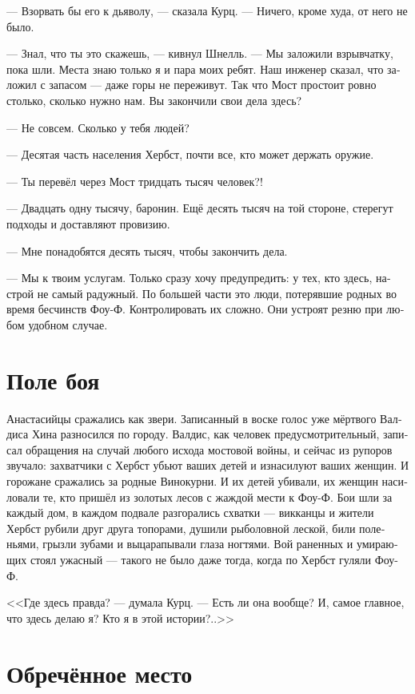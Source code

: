 \documentclass[a4paper,12pt,fleqn]{book}\usepackage{cooltooltips}\usepackage{polyglossia}\setdefaultlanguage[babelshorthands=true]{russian}\setotherlanguage{english}\defaultfontfeatures{Ligatures=TeX,Mapping=tex-text} \usepackage{xcolor}\definecolor{lightgray}{HTML}{bbbbbb}\color{lightgray}\newcommand{\ml}[3]{\textenglish{\textcolor{black}{#3}}}
\begin{document}
--- Взорвать бы его к дьяволу, --- сказала Курц.
--- Ничего, кроме худа, от него не было.

--- Знал, что ты это скажешь, --- кивнул Шнелль.
--- Мы заложили взрывчатку, пока шли.
Места знаю только я и пара моих ребят.
Наш инженер сказал, что заложил с запасом --- даже горы не переживут.
Так что Мост простоит ровно столько, сколько нужно нам.
Вы закончили свои дела здесь?

--- Не совсем.
Сколько у тебя людей?

--- Десятая часть населения Хербст, почти все, кто может держать оружие.

--- Ты перевёл через Мост тридцать тысяч человек?!

--- Двадцать одну тысячу, баронин.
Ещё десять тысяч на той стороне, стерегут подходы и доставляют провизию.

--- Мне понадобятся десять тысяч, чтобы закончить дела.

--- Мы к твоим услугам.
Только сразу хочу предупредить: у тех, кто здесь, настрой не самый радужный.
По большей части это люди, потерявшие родных во время бесчинств Фоу-Ф.
Контролировать их сложно.
Они устроят резню при любом удобном случае.

\section{Поле боя}

Анастасийцы сражались как звери.
Записанный в воске голос уже мёртвого Валдиса Хина разносился по городу.
Валдис, как человек предусмотрительный, записал обращения на случай любого исхода мостовой войны, и сейчас из рупоров звучало: захватчики с Хербст убьют ваших детей и изнасилуют ваших женщин.
И горожане сражались за родные Винокурни.
И их детей убивали, их женщин насиловали те, кто пришёл из золотых лесов с жаждой мести к Фоу-Ф.
Бои шли за каждый дом, в каждом подвале разгорались схватки --- викканцы и жители Хербст рубили друг друга топорами, душили рыболовной леской, били поленьями, грызли зубами и выцарапывали глаза ногтями.
Вой раненных и умирающих стоял ужасный --- такого не было даже тогда, когда по Хербст гуляли Фоу-Ф.

<<Где здесь правда? --- думала Курц.
--- Есть ли она вообще?
И, самое главное, что здесь делаю я?
Кто я в этой истории?..>>

\section{Обречённое место}
\end{document}
